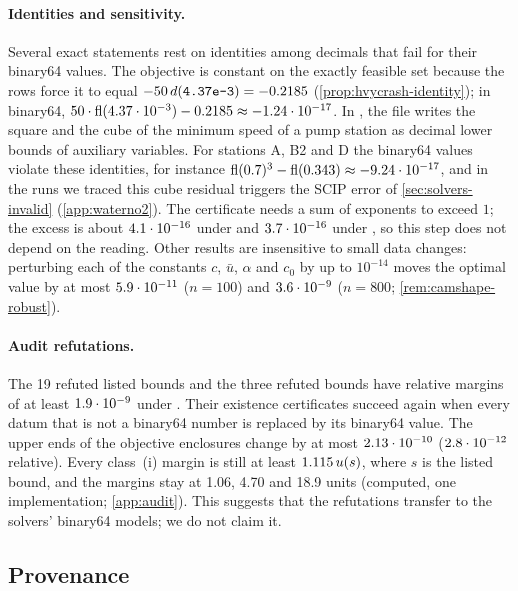 \paragraph{Identities and sensitivity.}
Several exact statements rest on identities among decimals that fail for their binary64 values.
The  objective is constant on the exactly feasible set because the rows force it to equal $-50\,d(\texttt{4.37e-3})=-0.2185$ (\cref{prop:hvycrash-identity}); in binary64, $50\cdot\operatorname{fl}(4.37\cdot10^{-3})-0.2185\approx-1.24\cdot 10^{-17}$.
In , the file writes the square and the cube of the minimum speed of a pump station as decimal lower bounds of auxiliary variables.
For stations A, B2 and D the binary64 values violate these identities, for instance $\operatorname{fl}(0.7)^3-\operatorname{fl}(0.343)\approx-9.24\cdot 10^{-17}$, and in the runs we traced this cube residual triggers the SCIP error of \cref{sec:solvers-invalid} (\cref{app:waterno2}).
The  certificate needs a sum of exponents to exceed $1$; the excess is about $4.1\cdot 10^{-16}$ under  and $3.7\cdot 10^{-16}$ under , so this step does not depend on the reading.
Other results are insensitive to small data changes: perturbing each of the  constants $c$, $\bar u$, $\alpha$ and $c_0$ by up to $10^{-14}$ moves the optimal value by at most $5.9\cdot 10^{-11}$ ($n=100$) and $3.6\cdot 10^{-9}$ ($n=800$; \cref{rem:camshape-robust}).

\paragraph{Audit refutations.}
The 19 refuted listed bounds and the three refuted  bounds have relative margins of at least $1.9\cdot 10^{-9}$ under .
Their existence certificates succeed again when every datum that is not a binary64 number is replaced by its binary64 value.
The upper ends of the objective enclosures change by at most $2.13\cdot 10^{-10}$ ($2.8\cdot 10^{-12}$ relative).
Every class~(i) margin is still at least $1.115\,u(s)$, where $s$ is the listed bound, and the  margins stay at 1.06, 4.70 and 18.9 units (computed, one implementation; \cref{app:audit}).
This suggests that the refutations transfer to the solvers' binary64 models; we do not claim it.

\subsection{Provenance}\label{app:semantics-provenance}

